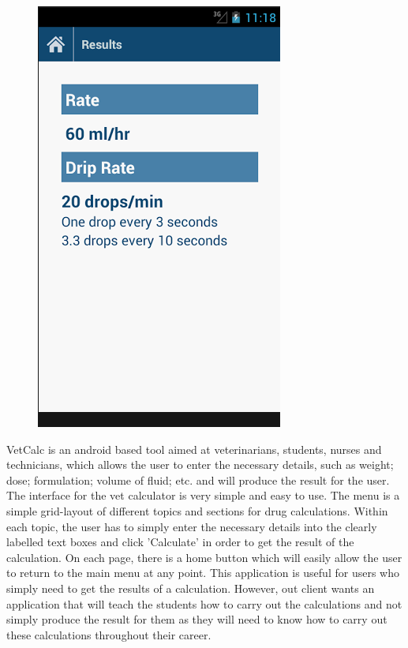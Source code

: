 \documentclass{l3proj}
\begin{document}
\begin{figure}[!htb]
  \includegraphics[width=\linewidth]{images/VetCalcApp/VetCalcApp4.png}
\endminipage
\end{figure}

VetCalc is an android based tool aimed at veterinarians, students, nurses and technicians, which allows the user to enter the necessary details, such as weight; dose; formulation; volume of fluid; etc. and will produce the result for the user. The interface for the vet calculator is very simple and easy to use. The menu is a simple grid-layout of different topics and sections for drug calculations. Within each topic, the user has to simply enter the necessary details into the clearly labelled text boxes and click 'Calculate' in order to get the result of the calculation. On each page, there is a home button which will easily allow the user to return to the main menu at any point. This application is useful for users who simply need to get the results of a calculation. However, out client wants an application that will teach the students how to carry out the calculations and not simply produce the result for them as they will need to know how to carry out these calculations throughout their career.
\end{document}
